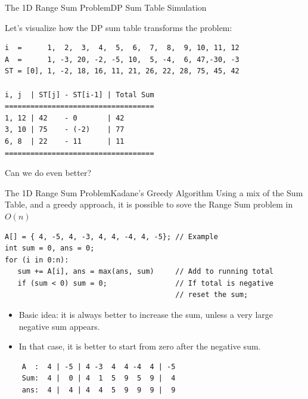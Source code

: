 \begin{frame}[fragile]{The 1D Range Sum Problem}{DP Sum Table Simulation}

  Let's visualize how the DP sum table transforms the problem:

{\smaller
\begin{verbatim}
i  =      1,  2,  3,  4,  5,  6,  7,  8,  9, 10, 11, 12
A  =      1, -3, 20, -2, -5, 10,  5, -4,  6, 47,-30, -3
ST = [0], 1, -2, 18, 16, 11, 21, 26, 22, 28, 75, 45, 42

i, j  | ST[j] - ST[i-1] | Total Sum
===================================
1, 12 | 42    - 0       | 42
3, 10 | 75    - (-2)    | 77
6, 8  | 22    - 11      | 11
===================================
\end{verbatim}
}
\bigskip

Can we do even better?
\end{frame}

\begin{frame}[fragile]{The 1D Range Sum Problem}{Kadane's Greedy Algorithm}
  Using a mix of the Sum Table, and a greedy approach, it is possible to sove the Range Sum problem in $O(n)$

  \begin{block}{}
      {\smaller
\begin{verbatim}
A[] = { 4, -5, 4, -3, 4, 4, -4, 4, -5}; // Example
int sum = 0, ans = 0;
for (i in 0:n):
   sum += A[i], ans = max(ans, sum)     // Add to running total
   if (sum < 0) sum = 0;                // If total is negative
                                        // reset the sum;
\end{verbatim}
      }
  \end{block}

\begin{itemize}
\item Basic idea: it is always better to increase the sum,
unless a very large negative sum appears.
\item In that case, it is better to start from zero after the negative sum.
\end{itemize}
\begin{verbatim}
    A  :  4 | -5 | 4 -3  4  4 -4  4 | -5
    Sum:  4 |  0 | 4  1  5  9  5  9 |  4
    ans:  4 |  4 | 4  4  5  9  9  9 |  9
\end{verbatim}
\end{frame}

